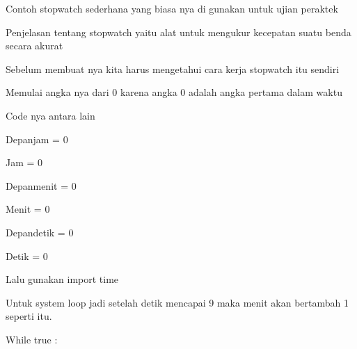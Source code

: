 {\fontsize{14pt}{14pt}\selectfont Contoh stopwatch sederhana yang biasa nya di gunakan untuk ujian peraktek  \\} \par
\vspace{14pt}
\noindent 
{\fontsize{14pt}{14pt}\selectfont Penjelasan tentang stopwatch yaitu alat untuk mengukur kecepatan suatu benda secara akurat \\} \par
\vspace{14pt}
\noindent 
{\fontsize{14pt}{14pt}\selectfont Sebelum membuat nya kita harus mengetahui cara kerja stopwatch itu sendiri  \\} \par
\vspace{14pt}
\noindent 
{\fontsize{14pt}{14pt}\selectfont Memulai angka nya dari 0 karena angka 0 adalah angka pertama dalam waktu \\} \par
\noindent 
{\fontsize{14pt}{14pt}\selectfont Code nya antara lain \\} \par
\vspace{14pt}
\noindent 
{\fontsize{14pt}{14pt}\selectfont Depanjam = 0 \\} \par
\noindent 
{\fontsize{14pt}{14pt}\selectfont Jam = 0 \\} \par
\noindent 
{\fontsize{14pt}{14pt}\selectfont Depanmenit = 0 \\} \par
\noindent 
{\fontsize{14pt}{14pt}\selectfont Menit = 0 \\} \par
\noindent 
{\fontsize{14pt}{14pt}\selectfont Depandetik = 0 \\} \par
\noindent 
{\fontsize{14pt}{14pt}\selectfont Detik = 0 \\} \par
\noindent 
{\fontsize{14pt}{14pt}\selectfont  Lalu gunakan import time \\} \par
\noindent 
{\fontsize{14pt}{14pt}\selectfont Untuk system loop jadi setelah detik mencapai 9 maka menit akan bertambah 1 seperti itu. \\} \par
\vspace{14pt}
\noindent 
{\fontsize{14pt}{14pt}\selectfont While true : \\} \par
